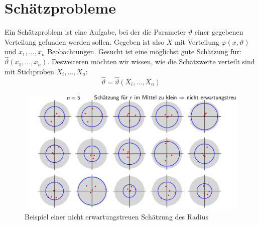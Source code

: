 \documentclass[../Main.tex]{subfiles}
\begin{document}
\section{Schätzprobleme}
Ein Schätzproblem ist eine Aufgabe, bei der die Parameter \(\vartheta\) einer gegebenen
Verteilung gefunden werden sollen. Gegeben ist also \(X\) mit Verteilung
\(\varphi(x,\vartheta)\) und \(x_1,\dots,x_n\) Beobachtungen.
Gesucht ist eine möglichst gute Schätzung für: \(\hat{\vartheta}(x_1,\dots,x_n)\).
Desweiteren möchten wir wissen, wie die Schätzwerte verteilt sind mit
Stichproben \(X_i,\dots,X_n\):
\begin{equation}
    \hat{\vartheta} = \hat{\vartheta}(X_i,\dots,X_n)
\end{equation}




\begin{figure}[H]
    \centering
    \includegraphics[width=1\linewidth]{Images/beispiel-nichterwartungstreu-radius.png}
    \caption{Beispiel einer nicht erwartungstreuen Schätzung des Radius}
\end{figure}
\end{document}
